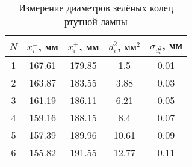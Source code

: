 \begin{table}[h]
			\begin{center}
				\begin{tabular}{|c|c|c|c|c|}
					\hline
          $ N $ & $ x_i^- $, мм & $ x_i^+ $, мм & $ d_i^2 $, $ \text{мм}^2 $ & $ \sigma_{d_i^2} $, мм\\ 
					\hline
					1 & 167.61 & 179.85 & 1.5 & 0.01 \\\hline
					2 & 163.87 & 183.55 & 3.88 & 0.03 \\\hline
					3 & 161.19 & 186.11 & 6.21 & 0.05 \\\hline
					4 & 159.16 & 188.15 & 8.4 & 0.07 \\\hline
					5 & 157.39 & 189.96 & 10.61 & 0.09 \\\hline
					6 & 155.82 & 191.55 & 12.77 & 0.11 \\
					\hline
				\end{tabular}
			\end{center}
			\caption{Измерение диаметров зелёных колец ртутной лампы}
			\label{Gr_table}
\end{table}
